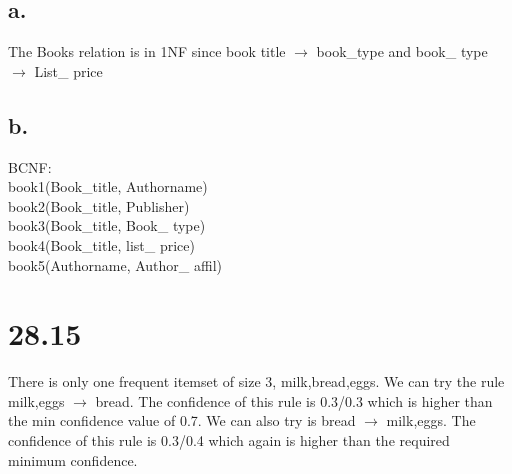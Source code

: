 \documentclass[11pt]{article}
\theoremstyle{plain}
\theoremstyle{definition}
\begin{document}
\subsection*{a.}
The Books relation is in 1NF since book title $\rightarrow$ book\_type and book\_ type $\rightarrow$ List\_ price\\
\subsection*{b.}
    BCNF:\\
book1(Book\_title, Authorname)\\
    book2(Book\_title, Publisher)\\
book3(Book\_title, Book\_ type)\\
    book4(Book\_title, list\_ price)\\
    book5(Authorname, Author\_ affil)\\

\section*{28.15}
There is only one frequent itemset of size 3, {milk,bread,eggs}.  We can try the rule milk,eggs $\rightarrow$ bread.  The confidence of this rule  is 0.3/0.3 which is higher than the min confidence value of 0.7.  We can also try is bread $\rightarrow$ milk,eggs.  The confidence of this rule is 0.3/0.4 which again is higher than the required minimum confidence.\\
\end{document}
